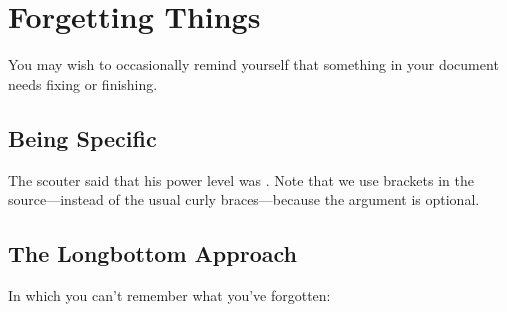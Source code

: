 \section{Forgetting Things}

You may wish to occasionally remind yourself that something in your document needs fixing or finishing.

\subsection{Being Specific}

The scouter said that his power level was \get[what?]. Note that we use brackets in the source---instead of the usual curly braces---because the argument is optional.

\subsection{The Longbottom Approach}

In which you can't remember what you've forgotten:

\get
